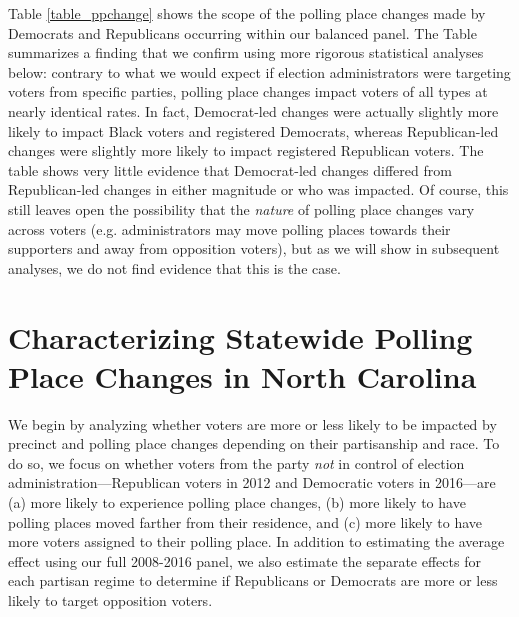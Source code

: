 \documentclass[12pt]{article}
\begin{document}
Table \ref{table_ppchange} shows the scope of the polling place changes made by Democrats and Republicans occurring within our balanced panel. The Table summarizes a finding that we confirm using more rigorous statistical analyses below: contrary to what we would expect if election administrators were targeting voters from specific parties, polling place changes impact voters of all types at nearly identical rates. In fact, Democrat-led changes were actually slightly more likely to impact Black voters and registered Democrats, whereas Republican-led changes were slightly more likely to impact registered Republican voters. The table shows very little evidence that Democrat-led changes differed from Republican-led changes in either magnitude or who was impacted. Of course, this still leaves open the possibility that the \emph{nature} of polling place changes vary across voters (e.g. administrators may move polling places towards their supporters and away from opposition voters), but as we will show in subsequent analyses, we do not find evidence that this is the case.




\section{\large Characterizing Statewide Polling Place Changes in North Carolina}\label{section_nc}
\vspace*{-0.5cm}

We begin by analyzing whether voters are more or less likely to be impacted by precinct and polling place changes depending on their partisanship and race.  To do so, we focus on whether voters from the party \emph{not} in control of election administration---Republican voters in 2012 and Democratic voters in 2016---are (a) more likely to experience polling place changes, (b) more likely to have polling places moved farther from their residence, and (c) more likely to have more voters assigned to their polling place. In addition to estimating the average effect using our full 2008-2016 panel, we also estimate the separate effects for each partisan regime to determine if Republicans or Democrats are more or less likely to target opposition voters.

\end{document}
